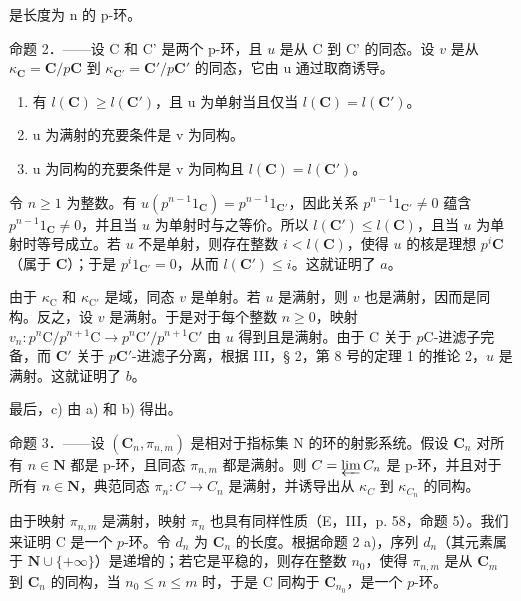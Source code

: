 是长度为 n 的 p-环。

命题 2．——设 C 和 C' 是两个 p-环，且 \(u\) 是从 C 到 C' 的同态。设 \(v\) 是从 \(\kappa_{\mathbf{C}} = \mathbf{C} / p\mathbf{C}\) 到 \(\kappa_{\mathbf{C}'} = \mathbf{C}' / p\mathbf{C}'\) 的同态，它由 u 通过取商诱导。

\begin{enumerate}
\def\labelenumi{\alph{enumi})}
\item
  有 \(l(\mathbf{C}) \geqslant l(\mathbf{C}')\)，且 u 为单射当且仅当 \(l(\mathbf{C}) = l(\mathbf{C}')\)。
\item
  u 为满射的充要条件是 v 为同构。
\item
  u 为同构的充要条件是 v 为同构且 \(l(\mathbf{C}) = l(\mathbf{C}')\)。
\end{enumerate}

令 \(n \geqslant 1\) 为整数。有 \(u(p^{n-1}1_{\mathbf{C}}) = p^{n-1}1_{\mathbf{C}'}\)，因此关系 \(p^{n-1}1_{\mathbf{C}'} \neq 0\) 蕴含 \(p^{n-1}1_{\mathbf{C}} \neq 0\)，并且当 \(u\) 为单射时与之等价。所以 \(l(\mathbf{C}') \leqslant l(\mathbf{C})\)，且当 \(u\) 为单射时等号成立。若 \(u\) 不是单射，则存在整数 \(i < l(\mathbf{C})\)，使得 \(u\) 的核是理想 \(p^i\mathbf{C}\)（属于 \(\mathbf{C}\)）；于是 \(p^i1_{\mathbf{C}'} = 0\)，从而 \(l(\mathbf{C}') \leqslant i\)。这就证明了 \(a\)。

由于 \(\kappa_{\mathrm{C}}\) 和 \(\kappa_{\mathrm{C}'}\) 是域，同态 \(v\) 是单射。若 \(u\) 是满射，则 \(v\) 也是满射，因而是同构。反之，设 \(v\) 是满射。于是对于每个整数 \(n \geqslant 0\)，映射 \(v_{n}: p^{n}\mathrm{C}/p^{n+1}\mathrm{C} \to p^{n}\mathrm{C}'/p^{n+1}\mathrm{C}'\) 由 \(u\) 得到且是满射。由于 C 关于 \(p\mathrm{C}\)-进滤子完备，而 \(\mathbf{C}'\) 关于 \(p\mathbf{C}'\)-进滤子分离，根据 III，§ 2，第 8 号的定理 1 的推论 2，\(u\) 是满射。这就证明了 \(b\)。

最后，c) 由 a) 和 b) 得出。

命题 3．——设 \((\mathbf{C}_{n}, \pi_{n,m})\) 是相对于指标集 N 的环的射影系统。假设 \(\mathbf{C}_{n}\) 对所有 \(n \in \mathbf{N}\) 都是 p-环，且同态 \(\pi_{n,m}\) 都是满射。则 \(C = \varprojlim C_{n}\) 是 p-环，并且对于所有 \(n \in \mathbf{N}\)，典范同态 \(\pi_{n}: C \to C_{n}\) 是满射，并诱导出从 \(\kappa_{C}\) 到 \(\kappa_{C_{n}}\) 的同构。

由于映射 \(\pi_{n,m}\) 是满射，映射 \(\pi_n\) 也具有同样性质（E，III，p. 58，命题 5）。我们来证明 C 是一个 \(p\)-环。令 \(d_n\) 为 \(\mathbf{C}_n\) 的长度。根据命题 2 a)，序列 \(d_n\)（其元素属于 \(\mathbf{N} \cup \{+\infty\}\)）是递增的；若它是平稳的，则存在整数 \(n_0\)，使得 \(\pi_{n,m}\) 是从 \(\mathbf{C}_m\) 到 \(\mathbf{C}_n\) 的同构，当 \(n_0 \leqslant n \leqslant m\) 时，于是 C 同构于 \(\mathbf{C}_{n_0}\)，是一个 \(p\)-环。

